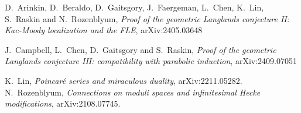 \documentclass[9pt]{amsart}
\theoremstyle{remark}
\theoremstyle{definition}
\theoremstyle{remark}
\numberwithin{equation}{section}
\begin{document}
\begin{thebibliography}{99}
 D.~Arinkin, D.~Beraldo, D.~Gaitsgory, J.~Faergeman, L.~Chen, K.~Lin, S.~Raskin and N.~Rozenblyum, \newline
{\it Proof of the geometric Langlands conjecture II: Kac-Moody localization and the FLE}, arXiv:2405.03648

 J.~Campbell, L.~Chen, D.~Gaitsgory and S.~Raskin, {\it Proof of the geometric Langlands conjecture III: \newline
compatibility with parabolic induction}, arXiv:2409.07051




%
%


 K.~Lin, {\it Poincar\'e series and miraculous duality}, arXiv:2211.05282.
%
%
%
%
 N.~Rozenblyum, {\it Connections on moduli spaces and infinitesimal Hecke modifications}, arXiv:2108.07745. 
%




\end{thebibliography}
\end{document}
